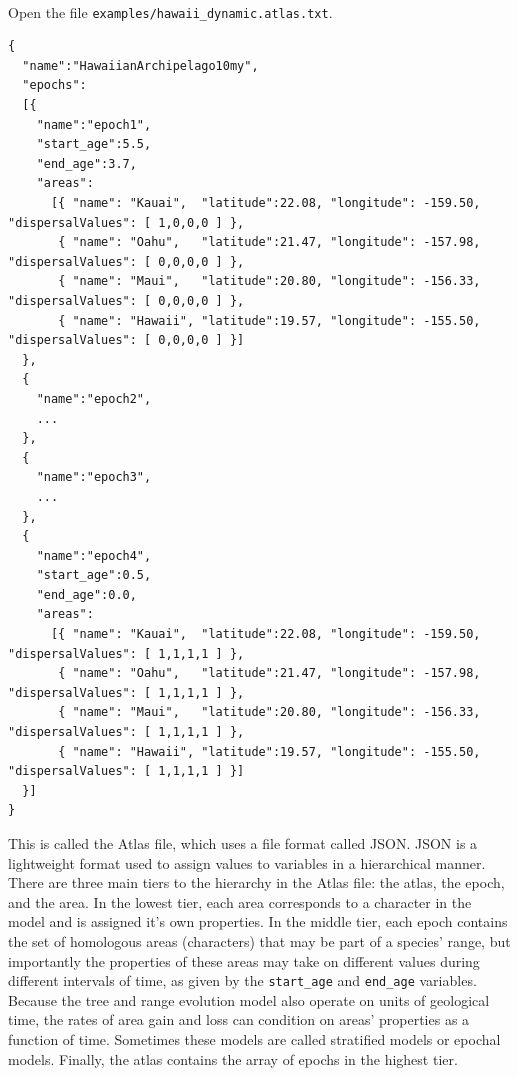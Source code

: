 \documentclass[11pt]{article}
\newcommand{\impmark}{\strut\vadjust{\domark}}
\newcommand{\domark}{%
  \vbox to 0pt{
    \kern-\dp\strutbox
    \smash{\llap{$\rightarrow$\kern1em}}
    \vss
  }%
}
\begin{document}
\newpage

\noindent \\ \impmark  Open the file \texttt{examples/hawaii\_dynamic.atlas.txt}.

\begin{framed}
\begin{lstlisting}[basicstyle=\tiny \listingsfont, columns=texcl]
{
  "name":"HawaiianArchipelago10my",
  "epochs":
  [{
    "name":"epoch1",
    "start_age":5.5,
    "end_age":3.7,
    "areas":
      [{ "name": "Kauai",  "latitude":22.08, "longitude": -159.50, "dispersalValues": [ 1,0,0,0 ] },
       { "name": "Oahu",   "latitude":21.47, "longitude": -157.98, "dispersalValues": [ 0,0,0,0 ] },
       { "name": "Maui",   "latitude":20.80, "longitude": -156.33, "dispersalValues": [ 0,0,0,0 ] },
       { "name": "Hawaii", "latitude":19.57, "longitude": -155.50, "dispersalValues": [ 0,0,0,0 ] }]
  },
  {
    "name":"epoch2",
    ...
  },
  {
    "name":"epoch3",
    ...
  },
  {
    "name":"epoch4",
    "start_age":0.5,
    "end_age":0.0,
    "areas":
      [{ "name": "Kauai",  "latitude":22.08, "longitude": -159.50, "dispersalValues": [ 1,1,1,1 ] },
       { "name": "Oahu",   "latitude":21.47, "longitude": -157.98, "dispersalValues": [ 1,1,1,1 ] },
       { "name": "Maui",   "latitude":20.80, "longitude": -156.33, "dispersalValues": [ 1,1,1,1 ] },
       { "name": "Hawaii", "latitude":19.57, "longitude": -155.50, "dispersalValues": [ 1,1,1,1 ] }]
  }]
}
\end{lstlisting}
\end{framed}

This is called the Atlas file, which uses a file format called JSON.
JSON is a lightweight format used to assign values to variables in a hierarchical manner.
There are three main tiers to the hierarchy in the Atlas file: the atlas, the epoch, and the area.
In the lowest tier, each area corresponds to a character in the model and is assigned it's own properties.
In the middle tier, each epoch contains the set of homologous areas (characters) that may be part of a species' range, but importantly the properties of these areas may take on different values during different intervals of time, as given by the {\tt start\_age} and {\tt end\_age} variables.
Because the tree and range evolution model also operate on units of geological time, the rates of area gain and loss can condition on areas' properties as a function of time.
Sometimes these models are called stratified models or epochal models.
Finally, the atlas contains the array of epochs in the highest tier.
\end{document}
